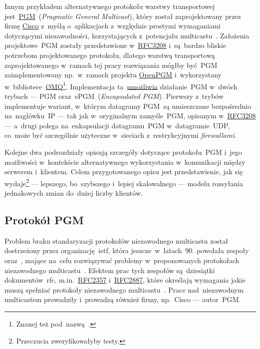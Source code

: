\documentclass[thesis]{subfiles}
\begin{document}
Innym przykładem alternatywnego protokołu warstwy transportowej jest~\href{https://en.wikipedia.org/wiki/Pragmatic_General_Multicast}{PGM}~(\emph{Pragmatic General Multicast}), który został zaprojektowany przez firmę \href{http://www.cisco.com/}{Cisco} z~myślą o~aplikacjach z~względnie prostymi wymaganiami dotyczącymi niezawodności, korzystających z~potencjału multicastu~\cite{pgm-rfc}. Założenia projektowe~PGM zostały przedstawione w~\href{https://tools.ietf.org/html/rfc3208}{RFC3208} i~są~bardzo bliskie potrzebom projektowanego protokołu, dlatego warstwą transportową zaprojektowanego w~ramach tej pracy rozwiązania mógłby być~PGM zaimplementowany np.~w~ramach projektu \href{https://code.google.com/archive/p/openpgm/}{OpenPGM} i~wykorzystany w~bibliotece~\href{http://zeromq.org/}{ØMQ}\footnote{Znanej też pod~nazwą~.}. Implementacja ta~\href{http://api.zeromq.org/2-1:zmq-pgm}{umożliwia} działanie~PGM w~dwóch trybach --- PGM oraz~ePGM~(\emph{Encapsulated PGM}). Pierwszy z~trybów implementuje wariant, w~którym datagramy PGM~są umieszczane bezpośrednio na~nagłówku~IP --- tak jak w~oryginalnym zamyśle~PGM, opisanym w~\href{https://tools.ietf.org/html/rfc3208}{RFC3208} --- a~drugi polega na~enkapsulacji datagramu~PGM w~datagramie~UDP, co~może być szczególnie użyteczne w~sieciach z~restrykcyjnymi \emph{firewallami}.

Kolejne dwa podrozdziały opisują szczegóły dotyczące protokołu~PGM i~jego możliwości w~kontekście alternatywnego wykorzystania w~komunikacji między serwerem i~klientem. Celem przygotowanego opisu jest przedstawienie, jak się wydaje\footnote{Przeczucia zweryfikowałyby testy.} --- lepszego, bo~szybszego i~lepiej skalowalnego --- modelu rozsyłania jednakowych zmian do~dużej liczby klientów.


\subsection{Protokół PGM}
\label{subsec:pgm}

Problem braku standaryzacji protokołów niezawodnego multicastu został dostrzeżony przez organizację~\gls{ietf}, która jeszcze~w~latach~90. powołała zespoły  oraz~, mające na~celu rozwiązywać problemy w~proponowanych protokołach niezawodnego multicastu~\cite{reliable-multicast-journal,reliable-multicast-transport}. Efektem prac tych zespołów są~dziesiątki dokumentów~\gls{rfc}, m.in.~\href{https://tools.ietf.org/html/rfc2357.html}{RFC2357} i~\href{https://tools.ietf.org/html/rfc2887}{RFC2887}, które określają wymagania jakie muszą spełniać protokoły niezawodnego multicastu~\cite{rfc2887,rfc2357}. Prace nad~niezawodnym multicastem prowadziły i~prowadzą również firmy, np.~Cisco --- autor~PGM.
\end{document}

